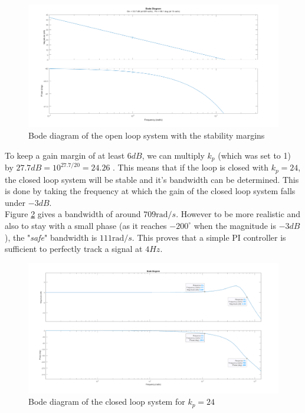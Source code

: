 \begin{figure}[H]
    \centering
    \includegraphics[height=\textheight/3]{Pictures/bode_OL.png}
    \caption{Bode diagram of the open loop system with the stability margins}
    \label{fig:OL bode}
\end{figure}

To keep a gain margin of at least $6 dB$, we can multiply $k_p$ (which was set to 1) by $27.7 dB = 10^{27.7/20} = 24.26$
. This means that if the loop is closed with $k_p = 24$, the closed loop system will be stable and it's bandwidth can
be determined. This is done by taking the frequency at which the gain of the closed loop system falls under $-3 dB$.\\ 
Figure \ref{fig:CL bode} gives a bandwidth of around $709 \text{rad}/s$. However to be more realistic and also to stay 
with a small phase (as it reaches $-200 ^{\circ}$ when the magnitude is $-3 dB$), the "\textit{safe}" bandwidth is $111 
\text{rad}/s$. This proves that a simple PI controller is sufficient to perfectly track a signal at $4 Hz$.

\begin{figure}[H]
    \centering
    \includegraphics[height=\textheight/3]{Pictures/bode_CL.png}
    \caption{Bode diagram of the closed loop system for $k_p = 24$}
    \label{fig:CL bode}
\end{figure}

